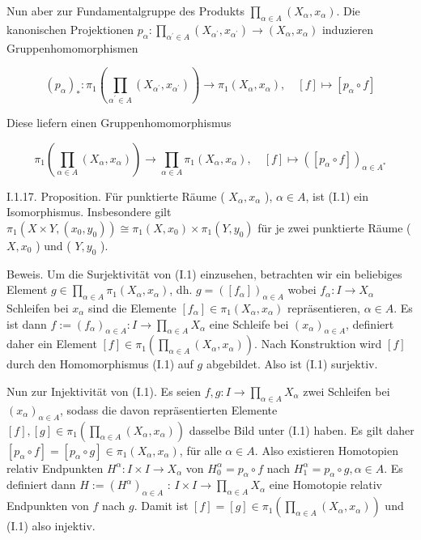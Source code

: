 \documentclass[10pt, letterpaper]{article}
\begin{document}
Nun aber zur Fundamentalgruppe des Produkts $\prod_{\alpha \in A}\left(X_{\alpha}, x_{\alpha}\right)$. Die kanonischen Projektionen $p_{\alpha}: \prod_{\alpha^{\prime} \in A}\left(X_{\alpha^{\prime}}, x_{\alpha^{\prime}}\right) \rightarrow\left(X_{\alpha}, x_{\alpha}\right)$ induzieren Gruppenhomomorphismen

$$
\left(p_{\alpha}\right)_{*}: \pi_{1}\left(\prod_{\alpha^{\prime} \in A}\left(X_{\alpha^{\prime}}, x_{\alpha^{\prime}}\right)\right) \rightarrow \pi_{1}\left(X_{\alpha}, x_{\alpha}\right), \quad[f] \mapsto\left[p_{\alpha} \circ f\right]
$$

Diese liefern einen Gruppenhomomorphismus

$$
\pi_{1}\left(\prod_{\alpha \in A}\left(X_{\alpha}, x_{\alpha}\right)\right) \rightarrow \prod_{\alpha \in A} \pi_{1}\left(X_{\alpha}, x_{\alpha}\right), \quad[f] \mapsto\left(\left[p_{\alpha} \circ f\right]\right)_{\alpha \in A^{*}}
$$

I.1.17. Proposition. Für punktierte Räume ( $X_{\alpha}, x_{\alpha}$ ), $\alpha \in A$, ist (I.1) ein Isomorphismus. Insbesondere gilt $\pi_{1}\left(X \times Y,\left(x_{0}, y_{0}\right)\right) \cong \pi_{1}\left(X, x_{0}\right) \times \pi_{1}\left(Y, y_{0}\right)$ für je zwei punktierte Räume ( $X, x_{0}$ ) und ( $Y, y_{0}$ ).

Beweis. Um die Surjektivität von (I.1) einzusehen, betrachten wir ein beliebiges Element $g \in \prod_{\alpha \in A} \pi_{1}\left(X_{\alpha}, x_{\alpha}\right)$, dh. $g=\left(\left[f_{\alpha}\right]\right)_{\alpha \in A}$ wobei $f_{\alpha}: I \rightarrow X_{\alpha}$ Schleifen bei $x_{\alpha}$ sind die Elemente $\left[f_{\alpha}\right] \in \pi_{1}\left(X_{\alpha}, x_{\alpha}\right)$ repräsentieren, $\alpha \in A$. Es ist dann $f:=\left(f_{\alpha}\right)_{\alpha \in A}: I \rightarrow \prod_{\alpha \in A} X_{\alpha}$ eine Schleife bei $\left(x_{\alpha}\right)_{\alpha \in A}$, definiert daher ein Element $[f] \in \pi_{1}\left(\prod_{\alpha \in A}\left(X_{\alpha}, x_{\alpha}\right)\right)$. Nach Konstruktion wird $[f]$ durch den Homomorphismus (I.1) auf $g$ abgebildet. Also ist (I.1) surjektiv.

Nun zur Injektivität von (I.1). Es seien $f, g: I \rightarrow \prod_{\alpha \in A} X_{\alpha}$ zwei Schleifen bei $\left(x_{\alpha}\right)_{\alpha \in A}$, sodass die davon repräsentierten Elemente $[f],[g] \in \pi_{1}\left(\prod_{\alpha \in A}\left(X_{\alpha}, x_{\alpha}\right)\right)$ dasselbe Bild unter (I.1) haben. Es gilt daher $\left[p_{\alpha} \circ f\right]=\left[p_{\alpha} \circ g\right] \in \pi_{1}\left(X_{\alpha}, x_{\alpha}\right)$, für alle $\alpha \in A$. Also existieren Homotopien relativ Endpunkten $H^{\alpha}: I \times I \rightarrow X_{\alpha}$ von $H_{0}^{\alpha}=p_{\alpha} \circ f$ nach $H_{1}^{\alpha}=p_{\alpha} \circ g, \alpha \in A$. Es definiert dann $H:=\left(H^{\alpha}\right)_{\alpha \in A}$ : $I \times I \rightarrow \prod_{\alpha \in A} X_{\alpha}$ eine Homotopie relativ Endpunkten von $f$ nach $g$. Damit ist $[f]=[g] \in \pi_{1}\left(\prod_{\alpha \in A}\left(X_{\alpha}, x_{\alpha}\right)\right)$ und (I.1) also injektiv.
\end{document}
